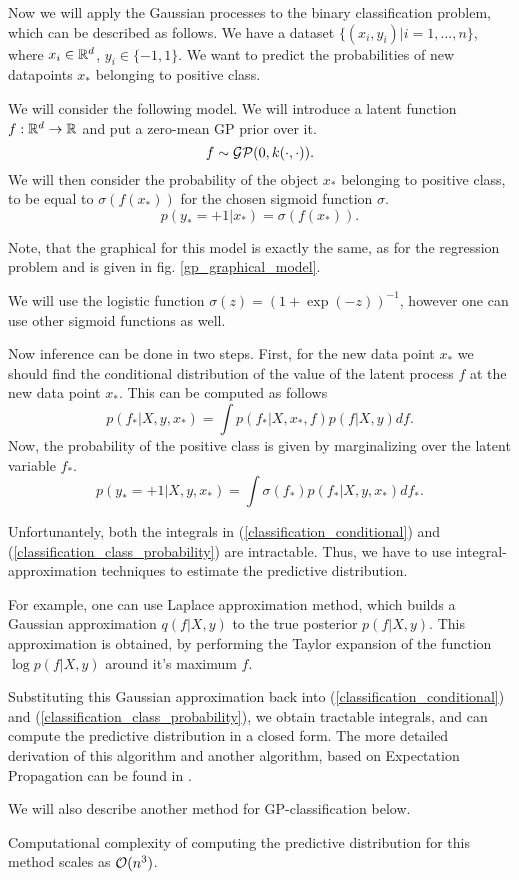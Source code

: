 \label{gp-classification}
Now we will apply the Gaussian processes to the binary classification problem, which can be described as follows. We have a dataset $\{(x_i, y_i) | i = 1, \ldots, n\}$, where $x_i \in \mathbb{R}^d$, $y_i \in \{-1, 1\}$. We want to predict the probabilities of new datapoints $x_*$ belonging to positive class.

We will consider the following model. We will introduce a latent function $f: \mathbb{R}^d \rightarrow \mathbb{R}$ and put a zero-mean GP prior over it. 
$$f \sim \mathcal{GP}(0, k(\cdot, \cdot)).$$
We will then consider the probability of the object $x_*$ belonging to positive class, to be equal to $\sigma(f(x_*))$ for the chosen sigmoid function $\sigma$.
$$p(y_* = +1 | x_*) = \sigma(f(x_*)).$$

Note, that the graphical for this model is exactly the same, as for the regression problem and is given in fig. \ref{gp_graphical_model}.

We will use the logistic function $\sigma(z) = (1 + \exp(-z))^{-1}$, however one can use other sigmoid functions as well.

Now inference can be done in two steps. First, for the new data point $x_*$ we should find the conditional distribution of the value of the latent process $f$ at the new data point $x_*$. This can be computed as follows
\begin{equation}
	\label{classification_conditional}
	p(f_* | X, y, x_*) = \int p(f_* | X, x_*, f) p(f | X, y) df.
\end{equation}
Now, the probability of the positive class is given by marginalizing over the latent variable $f_*$.
\begin{equation}
	\label{classification_class_probability}
	p(y_* = +1 | X, y, x_*) = \int \sigma(f_*) p(f_* | X, y, x_*) df_*.
\end{equation}

Unfortunantely, both the integrals in (\ref{classification_conditional}) and (\ref{classification_class_probability}) are intractable. Thus, we have to use integral-approximation techniques to estimate the predictive distribution. 

For example, one can use Laplace approximation method, which builds a Gaussian approximation $q(f | X, y)$ to the true posterior $p(f | X, y)$. This approximation is obtained, by performing the Taylor expansion of the function $\log p(f | X, y)$ around it's maximum $\hat f$. 

Substituting this Gaussian approximation back into (\ref{classification_conditional}) and (\ref{classification_class_probability}), we obtain tractable integrals, and can compute the predictive distribution in a closed form. The more detailed derivation of this algorithm and another algorithm, based on Expectation Propagation can be found in \cite{GPinML}.

We will also describe another method for GP-classification below.

Computational complexity of computing the predictive distribution for this method scales as $\mathcal{O}(n^3)$.
